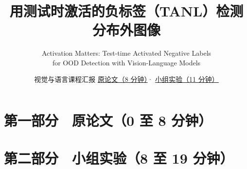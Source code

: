 \documentclass[aspectratio=169,11pt,usepdftitle=false]{beamer}
\title[\talkfooter]{用测试时激活的负标签（TANL）检测分布外图像}
\subtitle{Activation Matters: Test-time Activated Negative Labels\\
  for OOD Detection with Vision-Language Models}
\author[视觉与语言]{视觉与语言课程汇报\qquad
  \hyperlink{paper-start}{原论文（8 分钟）}\quad · \quad
  \hyperlink{group-start}{小组实验（11 分钟）}}
\institute{论文作者\quad Yabin Zhang 等\qquad
  \href{https://arxiv.org/abs/2603.25250v1}{arXiv:2603.25250v1（2026）}}
\date{}
\newcommand{\talkfooter}{TANL\quad 第一部分　原论文}
\begin{document}
\part{第一部分　原论文（0 至 8 分钟）}

\part{第二部分　小组实验（8 至 19 分钟）}
\renewcommand{\talkfooter}{TANL\quad 第二部分　小组改进}

\end{document}
